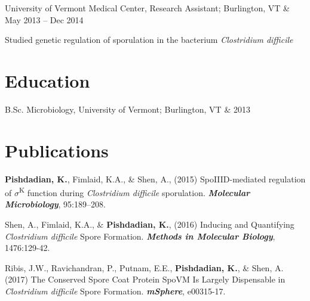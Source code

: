 \documentclass[letterpaper,hidelinks]{scrartcl}
\begin{document}
\begin{list1}
\item \begin{tabular1bold} University of Vermont Medical Center, Research Assistant; Burlington, VT & May 2013 -- Dec 2014 \end{tabular1bold}

  \begin{list2}
  \item Studied genetic regulation of sporulation in the bacterium \emph{Clostridium difficile}
  \end{list2}

\end{list1}


%
%

\section*{Education}

\begin{list1}
  \item\begin{tabular1bold}B.Sc. Microbiology, University of Vermont; Burlington, VT & 2013\end{tabular1bold}
\end{list1}

%
%

\section*{Publications}

\begin{list1}
\item \textbf{Pishdadian, K.}, Fimlaid, K.A., \& Shen, A., (2015) SpoIIID-mediated regulation of $\sigma$\textsuperscript{K} function during \emph{Clostridium difficile} sporulation. \textbf{\emph{Molecular Microbiology}}, 95:189--208.
\item Shen, A., Fimlaid, K.A., \& \textbf{Pishdadian, K.}, (2016) Inducing and Quantifying \emph{Clostridium difficile} Spore Formation. \textbf{\emph{Methods in Molecular Biology}}, 1476:129-42.
\item Ribis, J.W., Ravichandran, P., Putnam, E.E., \textbf{Pishdadian, K.}, \& Shen, A. (2017) The Conserved Spore Coat Protein SpoVM Is Largely Dispensable in \emph{Clostridium difficile} Spore Formation. \textbf{\emph{mSphere}}, e00315-17.
\end{list1}

%
%
\end{document}
